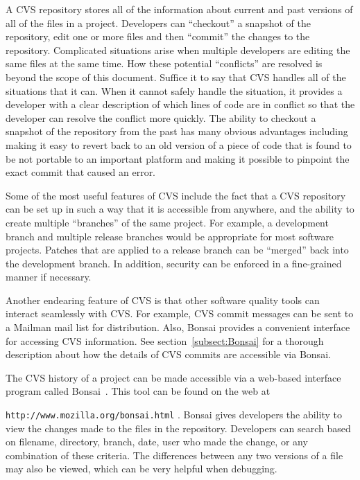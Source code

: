 \documentclass[12pt,relax]{article}
\newcommand{\InlineDirectory}[1]{
  {\hspace{0.01 in}} {\tt #1} {\hspace{0.01 in}}}
\begin{document}
A CVS repository stores all of the information about current and past versions
of all of the files in a project.
Developers can ``checkout'' a snapshot of 
the repository, edit one or more files and then ``commit'' the changes to the
repository.  Complicated situations arise when multiple developers are 
editing the same files at the same time.  How these potential ``conflicts'' 
are resolved is beyond the scope of this document.  Suffice it to say that 
CVS handles all of the situations that it can.  When it cannot safely handle 
the situation, it provides a developer with a clear description of which 
lines of code are in conflict so that the developer can resolve the 
conflict more quickly.  The ability to checkout a snapshot of the 
repository from the past has many obvious advantages including making it easy 
to revert back to an old version of a piece of code that is found to be not 
portable to an important platform and making it possible to pinpoint the exact 
commit that caused an error.

Some of the most useful features of CVS include the fact that a CVS 
repository can be set up in such a way that it is accessible from anywhere, 
and the ability to create multiple ``branches'' of the same project.  For 
example, a development branch and multiple release branches would be 
appropriate for most software projects.  Patches that are applied 
to a release branch can be ``merged'' back into the development branch.  
In addition, security can be enforced in a fine-grained manner if necessary.  

Another endearing feature of CVS is that other software quality tools can 
interact seamlessly with CVS.  For example, CVS commit messages can be sent to
a Mailman mail list for distribution.  Also, Bonsai provides a convenient 
interface for accessing CVS information.  See section~\ref{subsect:Bonsai} 
for a thorough description about how the details of CVS commits are accessible 
via Bonsai.


The CVS history of a project can be made accessible via a
web-based interface program called Bonsai~\cite{Bonsai}.  This tool can be 
found on the web at 
\newline
\InlineDirectory{http://www.mozilla.org/bonsai.html}.
Bonsai gives developers the ability to view the changes made to the files in 
the repository. Developers can search 
based on filename, directory, branch, date, user who made the 
change, or any combination of these criteria.  The differences between any two 
versions of a file may also be viewed, which can be very helpful when 
debugging.  
\end{document}
